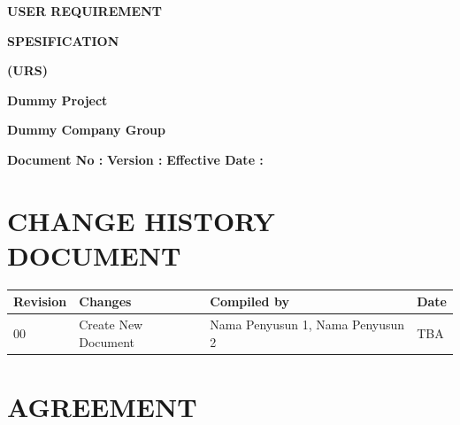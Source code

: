 \documentclass[12pt,a4paper]{article}
\begin{document}
\begin{titlepage}
\centering
\vspace{1cm}
{\Huge\bfseries USER REQUIREMENT\par}
\vspace{0.5cm}
{\Huge\bfseries SPESIFICATION\par}
\vspace{0.5cm}
{\Huge\bfseries (URS)\par}
\vfill
\vfill

{\Large\bfseries Dummy Project\par}
\vspace{0.5cm}
{\Large\bfseries Dummy Company Group\par}
\vspace{1cm}
\begin{flushleft}
\textbf{Document No :} \underline{\hspace{5cm}}
\vspace{0.5cm}
\textbf{Version :} \underline{\hspace{5cm}}
\vspace{0.5cm}
\textbf{Effective Date :} \underline{\hspace{5cm}}
\end{flushleft}
\end{titlepage}

\newpage

\section*{CHANGE HISTORY DOCUMENT}

\begin{longtable}{|p{3cm}|p{4cm}|p{3cm}|p{3cm}|}
\hline
\textbf{Revision} & \textbf{Changes} & \textbf{Compiled by} & \textbf{Date} \\
\hline
00 & Create New Document & Nama Penyusun 1, Nama Penyusun 2 & TBA \\
\hline
\end{longtable}

\newpage

\section*{AGREEMENT}
\end{document}
